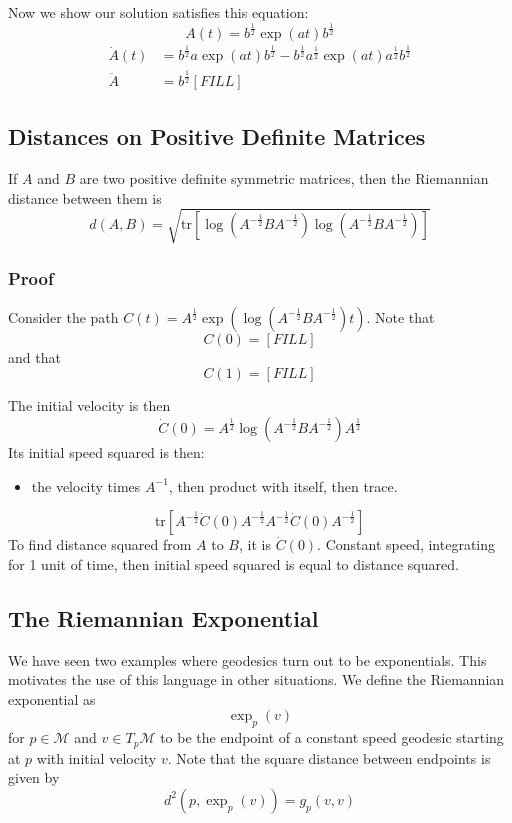 \documentclass[10pt]{article}
\begin{document}
Now we show our solution satisfies this equation:
\[A(t) = b^{\frac{1}{2}} \exp(at) b^{\frac{1}{2}}\]
\begin{align*}
    \dot{A}(t) &= b^{\frac{1}{2}} a \exp(at) b^{\frac{1}{2}} - b^{\frac{1}{2}} a^{\frac{1}{2}} \exp(at) a^{\frac{1}{2}} b^{\frac{1}{2}}\\
    \ddot{A} &= b^{\frac{1}{2}} [FILL]
\end{align*}

\subsection*{Distances on Positive Definite Matrices}
If $A$ and $B$ are two positive definite symmetric matrices, then the Riemannian distance between them is
\[d(A, B) = \sqrt{\text{tr} \left[\log(A^{-\frac{1}{2}}BA^{-\frac{1}{2}}) \log(A^{-\frac{1}{2}}BA^{-\frac{1}{2}})\right]}\]

\subsubsection*{Proof}
Consider the path $C(t) = A^{\frac{1}{2}} \exp(\log(A^{-\frac{1}{2}}BA^{-\frac{1}{2}})t)$.  Note that
\[C(0) = [FILL]\]
and that
\[C(1) = [FILL]\]

The initial velocity is then
\[\dot{C}(0) = A^{\frac{1}{2}} \log(A^{-\frac{1}{2}}BA^{-\frac{1}{2}}) A^{\frac{1}{2}}\]
Its initial speed squared is then:
\begin{itemize}
	\item the velocity times $A^{-1}$, then product with itself, then trace.
\end{itemize}
\[\text{tr} \left[A^{-\frac{1}{2}} \dot{C}(0) A^{-\frac{1}{2}} A^{-\frac{1}{2}} \dot{C}(0)A^{-\frac{1}{2}}\right]\]
To find distance squared from $A$ to $B$, it is $\dot{C}(0)$.  Constant speed, integrating for 1 unit of time, then initial speed squared is equal to distance squared.

\subsection*{The Riemannian Exponential}
We have seen two examples where geodesics turn out to be exponentials.  This motivates the use of this language in other situations.  We define the Riemannian exponential as
\[\exp_p(v)\]
for $p \in \mathcal{M}$ and $v \in T_p\mathcal{M}$ to be the endpoint of a constant speed geodesic starting at $p$ with initial velocity $v$.  Note that the square distance between endpoints is given by
\[d^2(p, \exp_p(v)) = g_p(v, v)\]
\end{document}
